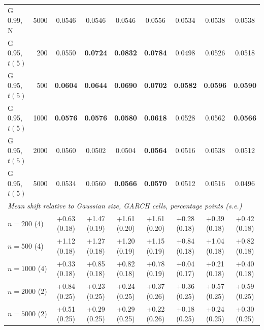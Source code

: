 \begin{tabular}{lrccccccc}
G 0.99, N & 5000 & 0.0546 & 0.0546 & 0.0546 & 0.0556 & 0.0534 & 0.0538 & 0.0538 \\
G 0.95, $t(5)$ & 200 & 0.0550 & \textbf{0.0724} & \textbf{0.0832} & \textbf{0.0784} & 0.0498 & 0.0526 & 0.0518 \\
G 0.95, $t(5)$ & 500 & \textbf{0.0604} & \textbf{0.0644} & \textbf{0.0690} & \textbf{0.0702} & \textbf{0.0582} & \textbf{0.0596} & \textbf{0.0590} \\
G 0.95, $t(5)$ & 1000 & \textbf{0.0576} & \textbf{0.0576} & \textbf{0.0580} & \textbf{0.0618} & 0.0528 & 0.0562 & \textbf{0.0566} \\
G 0.95, $t(5)$ & 2000 & 0.0560 & 0.0502 & 0.0504 & \textbf{0.0564} & 0.0516 & 0.0538 & 0.0512 \\
G 0.95, $t(5)$ & 5000 & 0.0534 & 0.0560 & \textbf{0.0566} & \textbf{0.0570} & 0.0512 & 0.0516 & 0.0496 \\
\midrule
\multicolumn{9}{l}{\emph{Mean shift relative to Gaussian size, GARCH cells, percentage points (s.e.)}}\\
\multicolumn{2}{l}{$n = 200$ (4)} & +0.63 (0.18) & +1.47 (0.19) & +1.61 (0.20) & +1.61 (0.20) & +0.28 (0.18) & +0.39 (0.18) & +0.42 (0.18) \\
\multicolumn{2}{l}{$n = 500$ (4)} & +1.12 (0.18) & +1.27 (0.18) & +1.20 (0.19) & +1.15 (0.19) & +0.84 (0.18) & +1.04 (0.18) & +0.82 (0.18) \\
\multicolumn{2}{l}{$n = 1000$ (4)} & +0.33 (0.18) & +0.85 (0.18) & +0.82 (0.18) & +0.78 (0.19) & +0.04 (0.17) & +0.21 (0.18) & +0.40 (0.18) \\
\multicolumn{2}{l}{$n = 2000$ (2)} & +0.84 (0.25) & +0.23 (0.25) & +0.24 (0.25) & +0.37 (0.26) & +0.36 (0.25) & +0.57 (0.25) & +0.59 (0.25) \\
\multicolumn{2}{l}{$n = 5000$ (2)} & +0.51 (0.25) & +0.29 (0.25) & +0.29 (0.25) & +0.22 (0.26) & +0.18 (0.25) & +0.24 (0.25) & +0.30 (0.25) \\
\bottomrule
\end{tabular}
